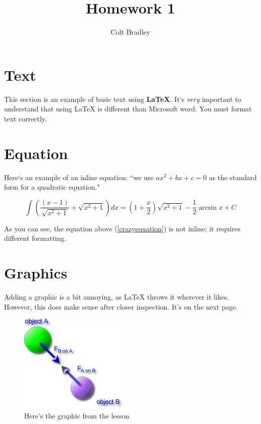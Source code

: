 \documentclass[11pt]{article}
\begin{document}
\title{Homework 1}
\date{}
\author{Colt Bradley}
\maketitle

\section{Text}
This section is an example of basic text using \textbf{LaTeX}. It`s {\em very} important to understand that using LaTeX is different than Microsoft word. You must format text correctly.

\section{Equation}

Here`s an example of an inline equation: ``we use $ax^2 +bx+c=0$ as the standard form for a quadratic equation."

\begin{equation}
\int \left( \frac{(x-1)}{\sqrt{x^2 +1}} + \sqrt{x^2 +1} \right) dx = \left( 1 + \frac{x}{2} \right) \sqrt{x^2 +1}- \frac{1}{2} \arcsin x +C \label{crazyequation}
\end{equation}

As you can see, the equation above (\ref{crazyequation}) is not inline; it requires different formatting.

\section{Graphics}

Adding a graphic is a bit annoying, as LaTeX throws it wherever it likes. However, this does make sense after closer inspection. It's on the next page.

\begin{figure}
\centering
\includegraphics[scale=.5]{N3L.jpg}
\caption{Here's the graphic from the lesson}
\end{figure}
\end{document}
